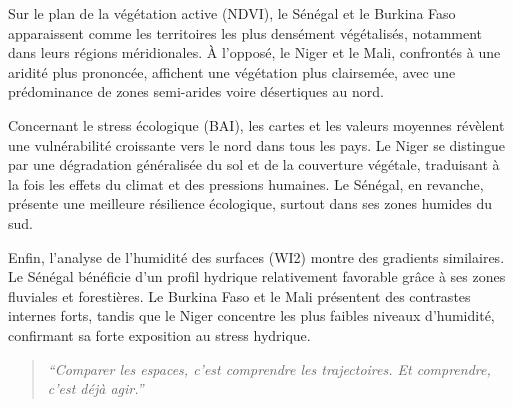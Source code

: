 \documentclass[
]{book}
\begin{document}
Sur le plan de la végétation active (NDVI), le Sénégal et le Burkina Faso apparaissent comme les territoires les plus densément végétalisés, notamment dans leurs régions méridionales. À l'opposé, le Niger et le Mali, confrontés à une aridité plus prononcée, affichent une végétation plus clairsemée, avec une prédominance de zones semi-arides voire désertiques au nord.

Concernant le stress écologique (BAI), les cartes et les valeurs moyennes révèlent une vulnérabilité croissante vers le nord dans tous les pays. Le Niger se distingue par une dégradation généralisée du sol et de la couverture végétale, traduisant à la fois les effets du climat et des pressions humaines. Le Sénégal, en revanche, présente une meilleure résilience écologique, surtout dans ses zones humides du sud.

Enfin, l'analyse de l'humidité des surfaces (WI2) montre des gradients similaires. Le Sénégal bénéficie d'un profil hydrique relativement favorable grâce à ses zones fluviales et forestières. Le Burkina Faso et le Mali présentent des contrastes internes forts, tandis que le Niger concentre les plus faibles niveaux d'humidité, confirmant sa forte exposition au stress hydrique.

\begin{quote}
\emph{``Comparer les espaces, c'est comprendre les trajectoires. Et comprendre, c'est déjà agir.''}
\end{quote}
\end{document}
